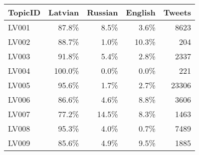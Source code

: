 \begin{tabular}{lrrrr}
\toprule
TopicID &  Latvian & Russian & English &  Tweets \\
\midrule
LV001    &  87.8\% &  8.5\% &  3.6\% &   8623 \\
LV002    &  88.7\% &  1.0\% & 10.3\% &    204 \\
LV003    &  91.8\% &  5.4\% &  2.8\% &   2337 \\
LV004    & 100.0\% &  0.0\% &  0.0\% &    221 \\
LV005    &  95.6\% &  1.7\% &  2.7\% &  23306 \\
LV006    &  86.6\% &  4.6\% &  8.8\% &   3606 \\
LV007    &  77.2\% & 14.5\% &  8.3\% &   1463 \\
LV008    &  95.3\% &  4.0\% &  0.7\% &   7489 \\
LV009    &  85.6\% &  4.9\% &  9.5\% &   1885 \\
\bottomrule
\end{tabular}
